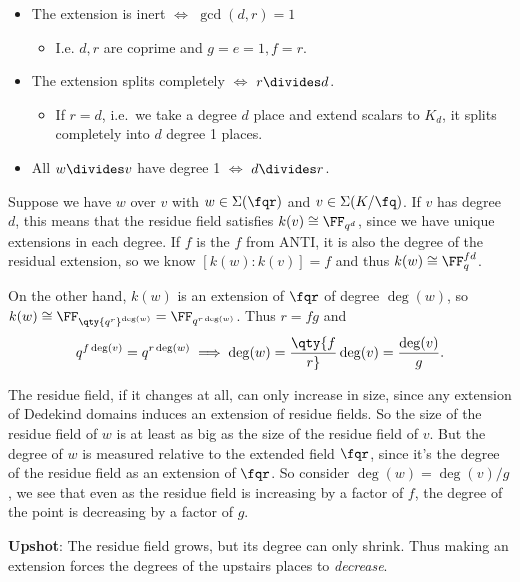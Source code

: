 \begin{example}[?]

\envlist

\begin{itemize}
\item
  The extension is inert \(\iff\) \(\gcd(d, r) = 1\)

  \begin{itemize}
  \tightlist
  \item
    I.e. \(d, r\) are coprime and \(g=e=1, f=r\).
  \end{itemize}
\item
  The extension splits completely \(\iff\) \(r \divides d\).

  \begin{itemize}
  \tightlist
  \item
    If \(r=d\), i.e.~we take a degree \(d\) place and extend scalars to
    \(K_d\), it splits completely into \(d\) degree 1 places.
  \end{itemize}
\item
  All \(w\divides v\) have degree 1 \(\iff\) \(d\divides r\).
\end{itemize}

\end{example}

\begin{remark}

Suppose we have \(w\) over \(v\) with \(w\in \Sigma(\fqr)\) and
\(v\in \Sigma(K/\fq)\). If \(v\) has degree \(d\), this means that the
residue field satisfies \(k(v) \cong \FF_{q^{d}}\), since we have unique
extensions in each degree. If \(f\) is the \(f\) from ANTI, it is also
the degree of the residual extension, so we know \([k(w): k(v)] = f\)
and thus \(k(w) \cong \FF_q^{f d}\).

On the other hand, \(k(w)\) is an extension of \(\fqr\) of degree
\(\deg(w)\), so
\(k(w) \cong \FF_{ \qty{q^r}^{\deg(w)} } = \FF_{q^{r\deg(w)}}\). Thus
\(r=fg\) and
\begin{align*}  
q^{f\deg(v)} = q^{r\deg(w)} \implies \deg(w) = \qty{f\over r}\deg(v) = { \deg(v) \over g}
.\end{align*}

The residue field, if it changes at all, can only increase in size,
since any extension of Dedekind domains induces an extension of residue
fields. So the size of the residue field of \(w\) is at least as big as
the size of the residue field of \(v\). But the degree of \(w\) is
measured relative to the extended field \(\fqr\), since it's the degree
of the residue field as an extension of \(\fqr\). So consider
\(\deg(w) = \deg(v)/g\), we see that even as the residue field is
increasing by a factor of \(f\), the degree of the point is decreasing
by a factor of \(g\).

\textbf{Upshot}: The residue field grows, but its degree can only
shrink. Thus making an extension forces the degrees of the upstairs
places to \emph{decrease}.

\end{remark}

